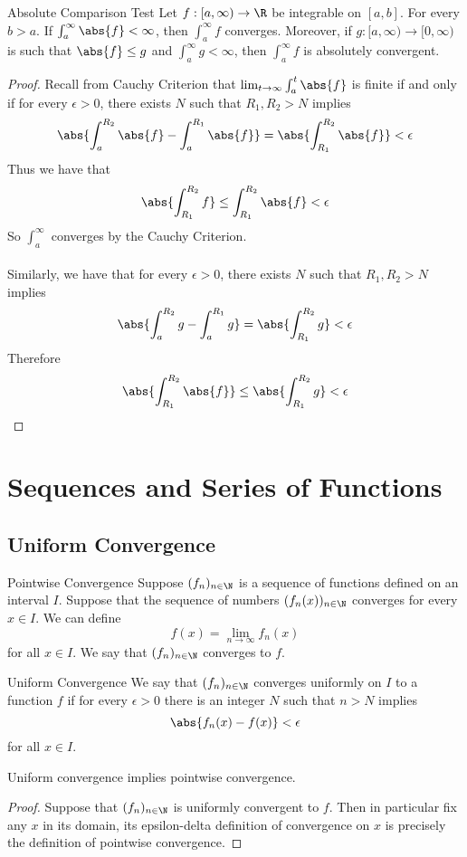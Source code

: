 \begin{thm}{Absolute Comparison Test}{} Let $f:[a,\infty)\to\R$ be integrable on $[a,b]$. For every $b>a$. If $\int_a^\infty\abs{f}<\infty$, then $\int_a^\infty f$ converges. Moreover, if $g:[a,\infty)\to[0,\infty)$ is such that $\abs{f}\leq g$ and $\int_a^\infty g<\infty$, then $\int_a^\infty f$ is absolutely convergent. \tcbline
\begin{proof} Recall from Cauchy Criterion that $\lim_{t\to\infty}\int_a^t\abs{f}$ is finite if and only if for every $\epsilon>0$, there exists $N$ such that $R_1,R_2>N$ implies $$\abs{\int_a^{R_2}\abs{f}-\int_a^{R_1}\abs{f}}=\abs{\int_{R_1}^{R_2}\abs{f}}<\epsilon$$ Thus we have that $$\abs{\int_{R_1}^{R_2}f}\leq\int_{R_1}^{R_2}\abs{f}<\epsilon$$ So $\int_a^\infty$ converges by the Cauchy Criterion. \\~\\
Similarly, we have that for every $\epsilon>0$, there exists $N$ such that $R_1,R_2>N$ implies $$\abs{\int_a^{R_2}g-\int_a^{R_1}g}=\abs{\int_{R_1}^{R_2}g}<\epsilon$$ Therefore $$\abs{\int_{R_1}^{R_2}\abs{f}}\leq\abs{\int_{R_1}^{R_2}g}<\epsilon$$
\end{proof}
\end{thm}

\pagebreak
\section{Sequences and Series of Functions}
\subsection{Uniform Convergence}
\begin{defn}{Pointwise Convergence}{} Suppose $(f_n)_{n\in\N}$ is a sequence of functions defined on an interval $I$. Suppose that the sequence of numbers $(f_n(x))_{n\in\N}$ converges for every $x\in I$. We can define $$f(x)=\lim_{n\to\infty}f_n(x)$$ for all $x\in I$. We say that $(f_n)_{n\in\N}$ converges to $f$. 
\end{defn}

\begin{defn}{Uniform Convergence}{} We say that $(f_n)_{n\in\N}$ converges uniformly on $I$ to a function $f$ if for every $\epsilon>0$ there is an integer $N$ such that $n>N$ implies $$\abs{f_n(x)-f(x)}<\epsilon$$ for all $x\in I$. 
\end{defn}

\begin{crl}{}{} Uniform convergence implies pointwise convergence. \tcbline
\begin{proof} Suppose that $(f_n)_{n\in\N}$ is uniformly convergent to $f$. Then in particular fix any $x$ in its domain, its epsilon-delta definition of convergence on $x$ is precisely the definition of pointwise convergence. 
\end{proof}
\end{crl}

